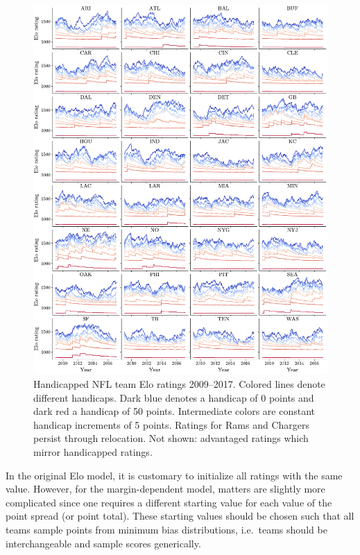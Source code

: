 \documentclass[aps,prc,reprint,amsmath,superscriptaddress,nofootinbib]{revtex4-1}
\begin{document}
\begin{figure}
  \includegraphics{team_history}
  \caption{\label{fig:history} Handicapped NFL team Elo ratings 2009--2017. Colored lines denote different handicaps. Dark blue denotes a handicap of 0 points and dark red a handicap of 50 points. Intermediate colors are constant handicap increments of 5 points. Ratings for Rams and Chargers persist through relocation. Not shown: advantaged ratings which mirror handicapped ratings.}
\end{figure}

In the original Elo model, it is customary to initialize all ratings with the same value. 
However, for the margin-dependent model, matters are slightly more complicated since one requires a different starting value for each value of the point spread (or point total).
These starting values should be chosen such that all teams sample points from minimum bias distributions, i.e.\ teams should be interchangeable and sample scores generically.
\end{document}
